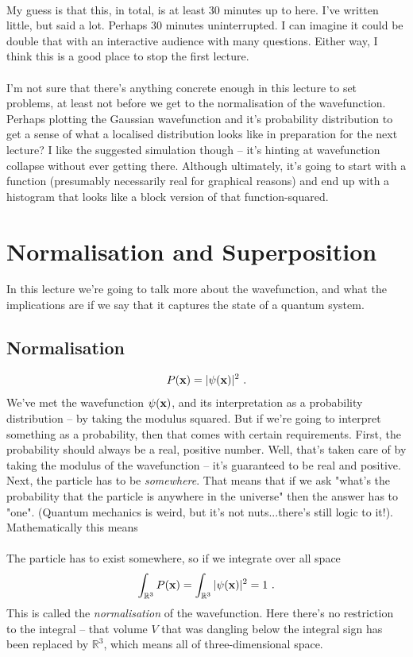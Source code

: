 \documentclass[12pt]{article}
\def\be{\begin{eqnarray}}
\def\ee{\end{eqnarray}}
\newcommand{\nn}{\nonumber}
\newcommand\para{\paragraph{}}
\newcommand{\bx}{{\bf x}}
\begin{document}
\para
{\color{red} My guess is that this, in total, is at least 30 minutes up to here. I've written little, but said a lot. Perhaps 30 minutes uninterrupted. I can imagine it could be double that with an interactive audience with many questions. Either way, I think this is a good place to stop the first lecture.} 

\para
{\color{blue} I'm not sure that there's anything concrete enough in this lecture to set problems, at least not before we get to the normalisation of the wavefunction. Perhaps plotting the Gaussian wavefunction and it's probability distribution to get a sense of what a localised distribution looks like in preparation for the next lecture?  I like the suggested simulation though -- it's hinting at wavefunction collapse without ever getting there. Although ultimately, it's going to start with a function (presumably necessarily real for graphical reasons) and end up with a histogram that looks like a block version of that function-squared.}





\newpage
\section{Normalisation and Superposition}

In this lecture we're going to talk more about the wavefunction, and what the implications are if we say that it captures the state of a quantum system. 

\subsection{Normalisation}

{\color{olive} \be P(\bx) = |\psi(\bx)|^2\ .\nn\ee}
We've met the wavefunction $\psi(\bx)$, and its interpretation as a probability distribution -- by taking the modulus squared. But if we're going to interpret something as a probability, then that comes with certain requirements. First, the probability should always be a real, positive number. Well, that's taken care of by taking the modulus of the wavefunction -- it's guaranteed to be real and positive. Next, the particle has to be {\it somewhere}. That means that if we ask "what's the probability that the particle is anywhere in the universe" then the answer has to "one". (Quantum mechanics is weird, but it's not nuts...there's still logic to it!). Mathematically this means

\para
{\color{olive} The particle has to exist somewhere, so if we integrate over all space 
\be \int_{\mathbb{R}^3} P(\bx) =  \int_{\mathbb{R}^3} |\psi(\bx)|^2 = 1\ .\nn\ee
%
This is called the {\it normalisation} of the wavefunction.}
%
Here there's no restriction to the integral -- that volume $V$ that was dangling below the integral sign has been replaced by $\mathbb{R}^3$, which means all of three-dimensional space. 
\end{document}
